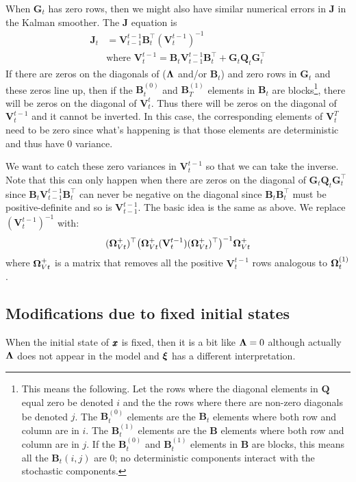 \documentclass[]{article}
\def\xixi{\mbox{\boldmath $\xi$}}
\def\LAM{\mbox{\boldmath $\Lambda$}}
\def\OMG{\mbox{\boldmath $\Omega$}}
\def\UPS{\mbox{\boldmath $\Upsilon$}}
\def\BB{\mbox{$\mathbf B$}}	\def\bb{\mbox{$\mathbf b$}} \def\Bb{\mbox{$\mathbf J$}} \def\Ba{\mbox{$\mathbf L$}} \def\Bm{\UPS}
\def\GG{\mbox{$\mathbf G$}}	\def\gg{\mbox{$\mathbf g$}}
\def\JJ{\mbox{$\mathbf J$}}
\def\QQ{\mbox{$\mathbf Q$}}	 \def\qq{\mbox{$\mathbf q$}} \def\Qb{\mbox{$\mathbf G$}}  \def\Qm{\mathbb{Q}}
\def\VV{\mbox{$\mathbf V$}}	\def\vv{\mbox{$\mathbf v$}}
\begin{document}
When $\GG_t$ has zero rows, then we might also have similar numerical errors in $\JJ$ in the Kalman smoother.  The $\JJ$ equation is 
\begin{equation}\label{eq:Jt.2}
\begin{split}
\JJ_t &= \VV_{t-1}^{t-1}\BB_t^\top(\VV_t^{t-1})^{-1}\\
&\text{where }\VV_t^{t-1} = \BB_t \VV_{t-1}^{t-1} \BB_t^\top + \GG_t\QQ_t\GG_t^\top
\end{split}
\end{equation}
If there are zeros on the diagonals of ($\LAM$ and/or $\BB_t$) and zero rows in $\GG_t$ and these zeros line up, then if the $\BB_t^{(0)}$ and $\BB_T^{(1)}$ elements in $\BB_t$ are blocks\footnote{This means the following.  Let the rows where the diagonal elements in $\QQ$ equal zero be denoted $i$ and the the rows where there are non-zero diagonals be denoted $j$. The $\BB_t^{(0)}$ elements are the $\BB_t$ elements where both row and column are in $i$.  The $\BB_t^{(1)}$ elements are the $\BB$ elements where both row and column are in $j$.  If the $\BB_t^{(0)}$ and $\BB_t^{(1)}$ elements in $\BB$ are blocks, this means all the $\BB_t(i,j)$ are 0; no deterministic components interact with the stochastic components.}, there will be zeros on the diagonal of $\VV_t^t$.  Thus there will be zeros on the diagonal of $\VV_t^{t-1}$ and it cannot be inverted.  In this case, the corresponding elements of $\VV_t^T$ need to be zero since what's happening is that those elements are deterministic and thus have 0 variance.

We want to catch these zero variances in $\VV_t^{t-1}$ so that we can take the inverse.  Note that this can only happen when there are zeros on the diagonal of $\GG_t\QQ_t\GG_t^\top$ since $\BB_t\VV_{t-1}^{t-1} \BB_t^\top$ can never be negative on the diagonal since $\BB_t\BB_t^\top$ must be positive-definite and so is $\VV_{t-1}^{t-1}$.  The basic idea is the same as above.  We replace $(\VV_t^{t-1})^{-1}$ with:
\begin{equation}
(\OMG_{Vt}^+)^\top\big(\OMG_{Vt}^+(\VV_t^{t-1})(\OMG_{Vt}^+)^\top\big)^{-1}\OMG_{Vt}^+
\end{equation}
where $\OMG_{Vt}^+$ is a matrix that removes all the positive $\VV_t^{t-1}$ rows analogous to  $\OMG_t^{(1)}$.

\subsection{Modifications due to fixed initial states}
When the initial state of $\mbox{$\pmb{x}$}$ is fixed, then it is a bit like $\LAM=0$ although actually $\LAM$ does not appear in the model and $\xixi$ has a different interpretation.  
\end{document}

